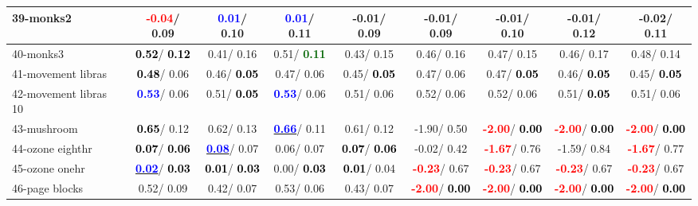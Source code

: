 \begin{table}[h]
\begin{center}
\begin{tabular}{lc|c|c|c|c|c|c|c}
39-monks2 & \textcolor{red}{\textbf{ -0.04}}/  0.09 & \textcolor{blue}{\textbf{  0.01}}/  0.10 & \textcolor{blue}{\textbf{  0.01}}/  0.11 &  -0.01/  0.09 &  -0.01/  0.09 &  -0.01/  0.10 &  -0.01/  0.12 &  -0.02/  0.11 \\ \hline
40-monks3 & \textcolor{black}{\textbf{  0.52}}/\textcolor{black}{\textbf{  0.12}} &   0.41/  0.16 &   0.51/\textcolor{darkgreen}{\textbf{  0.11}} &   0.43/  0.15 &   0.46/  0.16 &   0.47/  0.15 &   0.46/  0.17 &   0.48/  0.14 \\
41-movement libras & \textcolor{black}{\textbf{  0.48}}/  0.06 &   0.46/\textcolor{black}{\textbf{  0.05}} &   0.47/  0.06 &   0.45/\textcolor{black}{\textbf{  0.05}} &   0.47/  0.06 &   0.47/\textcolor{black}{\textbf{  0.05}} &   0.46/\textcolor{black}{\textbf{  0.05}} &   0.45/\textcolor{black}{\textbf{  0.05}} \\
42-movement libras 10 & \textcolor{blue}{\textbf{  0.53}}/  0.06 &   0.51/\textcolor{black}{\textbf{  0.05}} & \textcolor{blue}{\textbf{  0.53}}/  0.06 &   0.51/  0.06 &   0.52/  0.06 &   0.52/  0.06 &   0.51/\textcolor{black}{\textbf{  0.05}} &   0.51/  0.06 \\
43-mushroom & \textcolor{black}{\textbf{  0.65}}/  0.12 &   0.62/  0.13 & \underline{\textcolor{blue}{\textbf{  0.66}}}/  0.11 &   0.61/  0.12 &  -1.90/  0.50 & \textcolor{red}{\textbf{ -2.00}}/\textcolor{black}{\textbf{  0.00}} & \textcolor{red}{\textbf{ -2.00}}/\textcolor{black}{\textbf{  0.00}} & \textcolor{red}{\textbf{ -2.00}}/\textcolor{black}{\textbf{  0.00}} \\
44-ozone eighthr & \textcolor{black}{\textbf{  0.07}}/\textcolor{black}{\textbf{  0.06}} & \underline{\textcolor{blue}{\textbf{  0.08}}}/  0.07 &   0.06/  0.07 & \textcolor{black}{\textbf{  0.07}}/\textcolor{black}{\textbf{  0.06}} &  -0.02/  0.42 & \textcolor{red}{\textbf{ -1.67}}/  0.76 &  -1.59/  0.84 & \textcolor{red}{\textbf{ -1.67}}/  0.77 \\
45-ozone onehr & \underline{\textcolor{blue}{\textbf{  0.02}}}/\textcolor{black}{\textbf{  0.03}} & \textcolor{black}{\textbf{  0.01}}/\textcolor{black}{\textbf{  0.03}} &   0.00/\textcolor{black}{\textbf{  0.03}} & \textcolor{black}{\textbf{  0.01}}/  0.04 & \textcolor{red}{\textbf{ -0.23}}/  0.67 & \textcolor{red}{\textbf{ -0.23}}/  0.67 & \textcolor{red}{\textbf{ -0.23}}/  0.67 & \textcolor{red}{\textbf{ -0.23}}/  0.67 \\
46-page blocks &   0.52/  0.09 &   0.42/  0.07 &   0.53/  0.06 &   0.43/  0.07 & \textcolor{red}{\textbf{ -2.00}}/\textcolor{black}{\textbf{  0.00}} & \textcolor{red}{\textbf{ -2.00}}/\textcolor{black}{\textbf{  0.00}} & \textcolor{red}{\textbf{ -2.00}}/\textcolor{black}{\textbf{  0.00}} & \textcolor{red}{\textbf{ -2.00}}/\textcolor{black}{\textbf{  0.00}} \\ \hline

\end{tabular}
\end{center}
\end{table}
